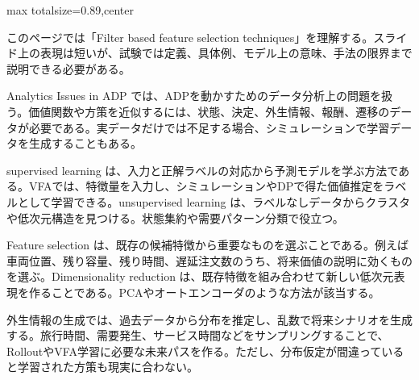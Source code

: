 \begin{minipage}[t]{0.58\textwidth}
\begin{adjustbox}{max totalsize={\textwidth}{0.89\textheight},center}
\begin{minipage}{\textwidth}\scriptsize
{}このページでは「Filter based feature selection techniques」を理解する。スライド上の表現は短いが、試験では定義、具体例、モデル上の意味、手法の限界まで説明できる必要がある。\par
Analytics Issues in ADP では、ADPを動かすためのデータ分析上の問題を扱う。価値関数や方策を近似するには、状態、決定、外生情報、報酬、遷移のデータが必要である。実データだけでは不足する場合、シミュレーションで学習データを生成することもある。\par
supervised learning は、入力と正解ラベルの対応から予測モデルを学ぶ方法である。VFAでは、特徴量を入力し、シミュレーションやDPで得た価値推定をラベルとして学習できる。unsupervised learning は、ラベルなしデータからクラスタや低次元構造を見つける。状態集約や需要パターン分類で役立つ。\par
Feature selection は、既存の候補特徴から重要なものを選ぶことである。例えば車両位置、残り容量、残り時間、遅延注文数のうち、将来価値の説明に効くものを選ぶ。Dimensionality reduction は、既存特徴を組み合わせて新しい低次元表現を作ることである。PCAやオートエンコーダのような方法が該当する。\par
外生情報の生成では、過去データから分布を推定し、乱数で将来シナリオを生成する。旅行時間、需要発生、サービス時間などをサンプリングすることで、RolloutやVFA学習に必要な未来パスを作る。ただし、分布仮定が間違っていると学習された方策も現実に合わない。\par

\end{minipage}
\end{adjustbox}
\end{minipage}
